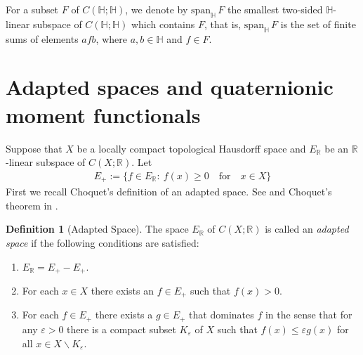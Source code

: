 \documentclass[11pt,a4paper]{amsart}
\theoremstyle{definition}
\newtheorem{definition}[theorem]{Definition}
\begin{document}
For a subset $F$ of $C(\mathbb{H};\mathbb{H})$, we denote by
${\mathrm{span}}_{\mathbb{H}}\, F$ the smallest two-sided $\mathbb{H}$-linear
subspace of $C(\mathbb{H};\mathbb{H})$ which contains $F$, that is,
${\mathrm{span}}_{\mathbb{H}}\, F$ is the set of finite sums of elements
$afb$, where $a,b\in \mathbb{H}$ and $f\in F$.

\section{Adapted spaces and quaternionic moment functionals}
\label{secadapted}

Suppose that $X$ be a locally compact topological Hausdorff space and
$E_{\mathbb{R}}$ be an $\mathbb{R}$-linear subspace of
$C(X;\mathbb{R})$. Let
%
\begin{align}
\label{defe+}
E_{+}:=\{ f\in E_{\mathbb{R}}:~ f(x)\geq 0 \quad \text{for} \quad x
\in X\}
\end{align}
%
First we recall Choquet's definition of an adapted space. See
\cite[Definition 1.5]{Schmudgen2017} and Choquet's theorem in
\cite{Choquet1969}.
%
\begin{definition}[Adapted Space]%
\label{adapted}
 The space $E_{\mathbb{R}}$ of $C(X;\mathbb{R})$ is called
an \emph{adapted space} if the following conditions are satisfied:
%
\begin{enumerate}
%
\item[\emph{(i)}] $ E_{\mathbb{R}}=E_{+}-E_{+}$.
%
\item[\emph{(ii)}] For each $x\in X$ there exists an $f\in E_{+}$ such that
$f(x)>0$.
%
\item[\emph{(iii)}] For each $f\in E_{+}$ there exists a $g\in E_{+}$ that
dominates $f$ in the sense that for any $\varepsilon >0$ there is a compact
subset $K_{\varepsilon}$ of $X$ such that
$f(x)\leq \varepsilon g(x)$ for all
$x\in X\backslash K_{\varepsilon}$.
%
\end{enumerate}
%
\end{definition}
\end{document}

